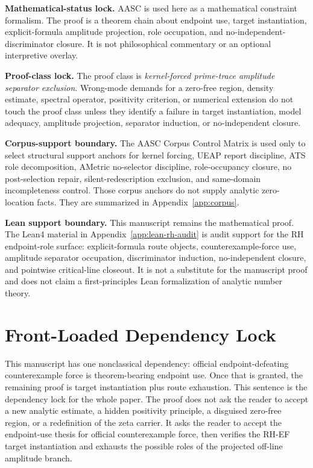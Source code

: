 \documentclass[11pt]{article}
\begin{document}
\textbf{Mathematical-status lock.} AASC is used here as a mathematical constraint formalism.  The proof is a theorem chain about endpoint use, target instantiation, explicit-formula amplitude projection, role occupation, and no-independent-discriminator closure.  It is not philosophical commentary or an optional interpretive overlay.

\textbf{Proof-class lock.} The proof class is \emph{kernel-forced prime-trace amplitude separator exclusion}.  Wrong-mode demands for a zero-free region, density estimate, spectral operator, positivity criterion, or numerical extension do not touch the proof class unless they identify a failure in target instantiation, model adequacy, amplitude projection, separator induction, or no-independent closure.

\textbf{Corpus-support boundary.} The AASC Corpus Control Matrix is used only to select structural support anchors for kernel forcing, UEAP report discipline, ATS role decomposition, AMetric no-selector discipline, role-occupancy closure, no post-selection repair, silent-redescription exclusion, and same-domain incompleteness control.  Those corpus anchors do not supply analytic zero-location facts.  They are summarized in Appendix~\ref{app:corpus}.

\textbf{Lean support boundary.} This manuscript remains the mathematical proof.  The Lean4 material in Appendix~\ref{app:lean-rh-audit} is audit support for the RH endpoint-role surface: explicit-formula route objects, counterexample-force use, amplitude separator occupation, discriminator induction, no-independent closure, and pointwise critical-line closeout.  It is not a substitute for the manuscript proof and does not claim a first-principles Lean formalization of analytic number theory.

\section*{Front-Loaded Dependency Lock}

This manuscript has one nonclassical dependency: official endpoint-defeating counterexample force is theorem-bearing endpoint use.  Once that is granted, the remaining proof is target instantiation plus route exhaustion.  This sentence is the dependency lock for the whole paper.  The proof does not ask the reader to accept a new analytic estimate, a hidden positivity principle, a disguised zero-free region, or a redefinition of the zeta carrier.  It asks the reader to accept the endpoint-use thesis for official counterexample force, then verifies the RH-EF target instantiation and exhausts the possible roles of the projected off-line amplitude branch.
\end{document}
